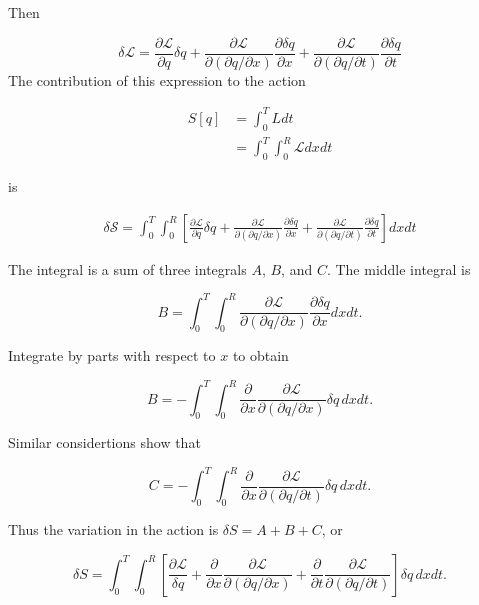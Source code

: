 Then 

\begin{equation}
\delta \mathcal{L} = \frac{\partial \mathcal{L}}{\partial q }
\delta q
+ \frac{\partial \mathcal{L}}{\partial (\partial q/\partial x) }
\frac{\partial \delta q}{\partial x}
+ \frac{\partial \mathcal{L}}{\partial (\partial q/\partial t) }
\frac{\partial \delta q}{\partial t}
\end{equation}
The contribution of this expression to the action

\begin{align}
S[q] &= \int_0^T L dt \\
&= \int_0^T \int_0^R \mathcal{L} dx dt
\end{align}

is

\begin{align}
\delta \mathcal{S} =  \int_0^T \int_0^R
\left[
\frac{\partial \mathcal{L}}{\partial q }
\delta q
+ \frac{\partial \mathcal{L}}{\partial (\partial q/\partial x) }
\frac{\partial \delta q}{\partial x}
+ \frac{\partial \mathcal{L}}{\partial (\partial q/\partial t) }
\frac{\partial \delta q}{\partial t}
\right] dx dt
\end{align}

The integral is a sum of three integrals $A$, $B$, and $C$. The middle integral is

\begin{equation}
B = \int_0^T \int_0^R \frac{\partial \mathcal{L}}{\partial (\partial q/\partial x) }
\frac{\partial \delta q}{\partial x} dx dt .
\end{equation}

Integrate by parts with respect to $x$ to obtain

\begin{equation}
B = - \int_0^T \int_0^R \frac{\partial}{\partial x}\frac{\partial \mathcal{L}}{\partial (\partial q/\partial x) } \delta q \,dx dt .
\end{equation}

Similar considertions show that

\begin{equation}
C = - \int_0^T \int_0^R \frac{\partial}{\partial x}\frac{\partial \mathcal{L}}{\partial (\partial q/\partial t) } \delta q \,dx dt .
\end{equation}

Thus the variation in the action is $\delta S = A + B + C$, or

\begin{equation}
\delta S 
= \int_0^T \int_0^R\left[ 
\frac{\partial \mathcal{L}}{\delta q}
+ \frac{\partial }{\partial x}\frac{\partial \mathcal{L}}{\partial (\partial q/\partial x) } 
+  \frac{\partial}{\partial t}\frac{\partial \mathcal{L}}{\partial (\partial q/\partial t) } 
\right]\delta q \,dx dt .
\end{equation}

